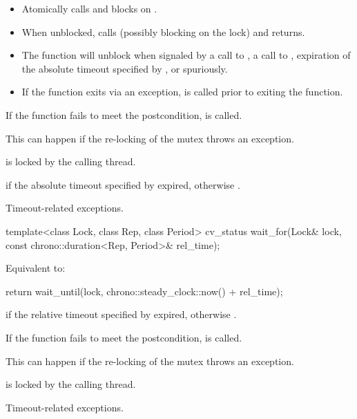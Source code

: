 \begin{itemdescr}
\pnum
\effects

\begin{itemize}
\item
{}%
Atomically calls  and blocks on .

\item
When unblocked, calls  (possibly blocking on the lock) and returns.

\item
The function will unblock when signaled by a call to , a call to ,
expiration of the absolute timeout specified by ,
or spuriously.

\item
If the function exits via an exception,  is called prior to exiting the function.
\end{itemize}

\pnum
\remarks
If the function fails to meet the postcondition, 
is called.
\begin{note}
This can happen if the re-locking of the mutex throws an exception.
\end{note}

\pnum
\ensures
{} is locked by the calling thread.

\pnum
\returns
{} if
the absolute timeout specified by  expired,
otherwise .

\pnum
\throws
Timeout-related
exceptions.
\end{itemdescr}

%
\begin{itemdecl}
template<class Lock, class Rep, class Period>
  cv_status wait_for(Lock& lock, const chrono::duration<Rep, Period>& rel_time);
\end{itemdecl}

\begin{itemdescr}
\pnum
\effects
Equivalent to:
\begin{codeblock}
return wait_until(lock, chrono::steady_clock::now() + rel_time);
\end{codeblock}

\pnum
\returns
{} if
the relative timeout specified by  expired,
otherwise .

\pnum
\remarks
If the function fails to meet the postcondition, 
is called.
\begin{note}
This can happen if the re-locking of the mutex throws an exception.
\end{note}

\pnum
\ensures
{} is locked by the calling thread.

\pnum
\throws
Timeout-related
exceptions.
\end{itemdescr}

